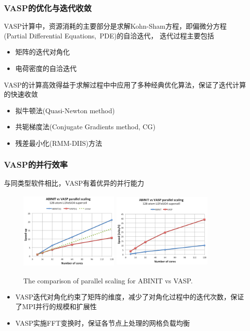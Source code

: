 \frame
{
	\frametitle{\textrm{VASP}的优化与迭代收敛}
	\textrm{VASP}计算中，资源消耗的主要部分是求解\textrm{Kohn-Sham}方程，即偏微分方程\textrm{(Partial Differential Equations,~PDE)}的自洽迭代， 迭代过程主要包括
	\begin{itemize}
		\item 矩阵的迭代对角化
		\item 电荷密度的自洽迭代
	\end{itemize}

	\vskip 10pt
	\textrm{VASP}的计算高效得益于求解过程中中应用了多种经典优化算法，保证了迭代计算的快速收敛
	\begin{itemize} 
		\item 拟牛顿法\textrm{(Quasi-Newton method)}
		\item 共轭梯度法\textrm{(Conjugate Gradients method, CG)}
		\item 残差最小化\textrm{(RMM-DIIS)}方法
	\end{itemize}
}

\frame
{
	\frametitle{\textrm{VASP}的并行效率}
	与同类型软件相比，\textrm{VASP}有着优异的并行能力
\begin{figure}[h!]
	\vspace{-0.15in}
\centering
\includegraphics[height=1.55in,width=1.95in,viewport=0 0 240 200,clip]{Figures/VASP-abinit_Li128-1.png}
\includegraphics[height=1.55in,width=1.95in,viewport=0 0 240 200,clip]{Figures/VASP-abinit_Li128-2.png}
\caption{\tiny \textrm{The comparison of parallel scaling for ABINIT vs VASP.}}%
\label{ABINIT_vs_VASP}
\end{figure} 
\begin{itemize}
	\item \textrm{VASP}迭代对角化约束了矩阵的维度，减少了对角化过程中的迭代次数，保证了\textrm{MPI}并行的规模和扩展性
	\item \textrm{VASP}实施\textrm{FFT}变换时，保证各节点上处理的网格负载均衡
\end{itemize}
}

